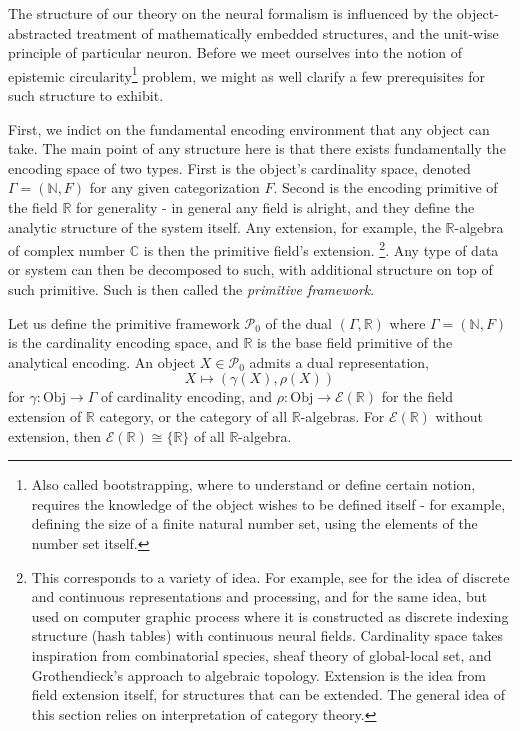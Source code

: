 The structure of our theory on the neural formalism is influenced by the object-abstracted treatment of mathematically embedded structures, and the unit-wise principle of particular neuron. Before we meet ourselves into the notion of epistemic circularity\footnote{Also called bootstrapping, where to understand or define certain notion, requires the knowledge of the object wishes to be defined itself - for example, defining the size of a finite natural number set, using the elements of the number set itself.} problem, we might as well clarify a few prerequisites for such structure to exhibit. 

First, we indict on the fundamental encoding environment that any object can take. The main point of any structure here is that there exists fundamentally the encoding space of two types. First is the object's cardinality space, denoted $\Gamma=(\mathbb{N},F)$ for any given categorization $F$. Second is the encoding primitive of the field $\mathbb{R}$ for generality - in general any field is alright, and they define the analytic structure of the system itself. Any extension, for example, the $\mathbb{R}$-algebra of complex number $\mathbb{C}$ is then the primitive field's extension. \footnote{This corresponds to a variety of idea. For example, see \cite{Cartuyvels_2021} for the idea of discrete and continuous representations and processing, and \cite{M_ller_2022} for the same idea, but used on computer graphic process where it is constructed as discrete indexing structure (hash tables) with continuous neural fields. Cardinality space takes inspiration from combinatorial species, sheaf theory of global-local set, and Grothendieck's approach to algebraic topology. Extension is the idea from field extension itself, for structures that can be extended. The general idea of this section relies on interpretation of category theory.}. Any type of data or system can then be decomposed to such, with additional structure on top of such primitive. Such is then called the \textit{primitive framework}. 

\begin{definition}
    Let us define the primitive framework $\mathcal{P}_{0}$ of the dual $(\Gamma, \mathbb{R})$ where $\Gamma=(\mathbb{N},F)$ is the cardinality encoding space, and $\mathbb{R}$ is the base field primitive of the analytical encoding. An object $X\in \mathcal{P}_{0}$ admits a dual representation, 
    \begin{equation}
        X \mapsto (\gamma(X),\rho(X))
    \end{equation}
    for $\gamma: \mathrm{Obj}\to \Gamma$ of cardinality encoding, and $\rho:\mathrm{Obj}\to\mathcal{E}(\mathbb{R})$ for the field extension of $\mathbb{R}$ category, or the category of all $\mathbb{R}$-algebras. For $\mathcal{E}(\mathbb{R})$ without extension, then $\mathcal{E}(\mathbb{R})\cong \{\mathbb{R}\}$ of all $\mathbb{R}$-algebra. 
\end{definition}

